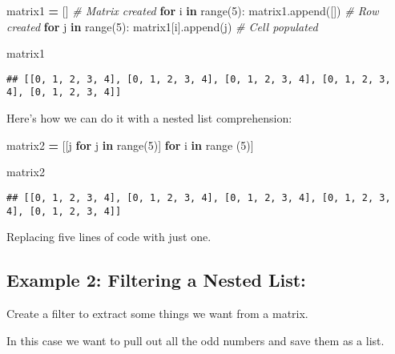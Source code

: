\documentclass[
]{book}
\newenvironment{Shaded}{\begin{snugshade}}{\end{snugshade}}
\newcommand{\BuiltInTok}[1]{#1}
\newcommand{\CommentTok}[1]{\textcolor[rgb]{0.56,0.35,0.01}{\textit{#1}}}
\newcommand{\ControlFlowTok}[1]{\textcolor[rgb]{0.13,0.29,0.53}{\textbf{#1}}}
\newcommand{\DecValTok}[1]{\textcolor[rgb]{0.00,0.00,0.81}{#1}}
\newcommand{\KeywordTok}[1]{\textcolor[rgb]{0.13,0.29,0.53}{\textbf{#1}}}
\newcommand{\NormalTok}[1]{#1}
\newcommand{\OperatorTok}[1]{\textcolor[rgb]{0.81,0.36,0.00}{\textbf{#1}}}
\begin{document}
\begin{Shaded}
\begin{Highlighting}[]
\NormalTok{matrix1 }\OperatorTok{=}\NormalTok{ [] }\CommentTok{\# Matrix created}
\ControlFlowTok{for}\NormalTok{ i }\KeywordTok{in} \BuiltInTok{range}\NormalTok{(}\DecValTok{5}\NormalTok{):}
\NormalTok{    matrix1.append([]) }\CommentTok{\# Row created}
    \ControlFlowTok{for}\NormalTok{ j }\KeywordTok{in} \BuiltInTok{range}\NormalTok{(}\DecValTok{5}\NormalTok{):}
\NormalTok{        matrix1[i].append(j) }\CommentTok{\# Cell populated}
        
\NormalTok{matrix1}
\end{Highlighting}
\end{Shaded}

\begin{verbatim}
## [[0, 1, 2, 3, 4], [0, 1, 2, 3, 4], [0, 1, 2, 3, 4], [0, 1, 2, 3, 4], [0, 1, 2, 3, 4]]
\end{verbatim}

Here's how we can do it with a nested list comprehension:

\begin{Shaded}
\begin{Highlighting}[]
\NormalTok{matrix2 }\OperatorTok{=}\NormalTok{ [[j }\ControlFlowTok{for}\NormalTok{ j }\KeywordTok{in} \BuiltInTok{range}\NormalTok{(}\DecValTok{5}\NormalTok{)] }\ControlFlowTok{for}\NormalTok{ i }\KeywordTok{in} \BuiltInTok{range}\NormalTok{ (}\DecValTok{5}\NormalTok{)]}

\NormalTok{matrix2}
\end{Highlighting}
\end{Shaded}

\begin{verbatim}
## [[0, 1, 2, 3, 4], [0, 1, 2, 3, 4], [0, 1, 2, 3, 4], [0, 1, 2, 3, 4], [0, 1, 2, 3, 4]]
\end{verbatim}

Replacing five lines of code with just one.

\subsection{Example 2: Filtering a Nested List:}\label{example-2-filtering-a-nested-list}

Create a filter to extract some things we want from a matrix.

In this case we want to pull out all the odd numbers and save them as a list.
\end{document}
